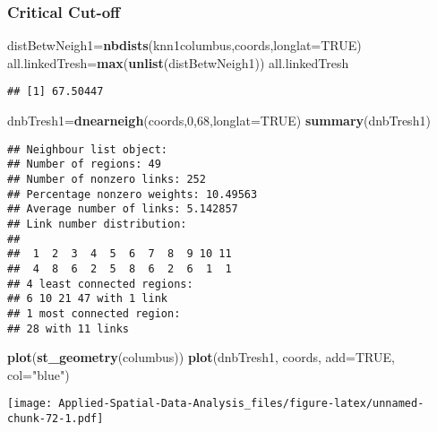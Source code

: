 \documentclass[
]{book}
\newenvironment{Shaded}{\begin{snugshade}}{\end{snugshade}}
\newcommand{\DataTypeTok}[1]{\textcolor[rgb]{0.13,0.29,0.53}{#1}}
\newcommand{\DecValTok}[1]{\textcolor[rgb]{0.00,0.00,0.81}{#1}}
\newcommand{\KeywordTok}[1]{\textcolor[rgb]{0.13,0.29,0.53}{\textbf{#1}}}
\newcommand{\NormalTok}[1]{#1}
\newcommand{\OtherTok}[1]{\textcolor[rgb]{0.56,0.35,0.01}{#1}}
\newcommand{\StringTok}[1]{\textcolor[rgb]{0.31,0.60,0.02}{#1}}
\begin{document}
\hypertarget{critical-cut-off}{%
\subsubsection{Critical Cut-off}\label{critical-cut-off}}

\begin{Shaded}
\begin{Highlighting}[]
\NormalTok{distBetwNeigh1=}\KeywordTok{nbdists}\NormalTok{(knn1columbus,coords,}\DataTypeTok{longlat=}\OtherTok{TRUE}\NormalTok{)}
\NormalTok{all.linkedTresh=}\KeywordTok{max}\NormalTok{(}\KeywordTok{unlist}\NormalTok{(distBetwNeigh1))}
\NormalTok{all.linkedTresh}
\end{Highlighting}
\end{Shaded}

\begin{verbatim}
## [1] 67.50447
\end{verbatim}

\begin{Shaded}
\begin{Highlighting}[]
\NormalTok{dnbTresh1=}\KeywordTok{dnearneigh}\NormalTok{(coords,}\DecValTok{0}\NormalTok{,}\DecValTok{68}\NormalTok{,}\DataTypeTok{longlat=}\OtherTok{TRUE}\NormalTok{)}
\KeywordTok{summary}\NormalTok{(dnbTresh1)}
\end{Highlighting}
\end{Shaded}

\begin{verbatim}
## Neighbour list object:
## Number of regions: 49 
## Number of nonzero links: 252 
## Percentage nonzero weights: 10.49563 
## Average number of links: 5.142857 
## Link number distribution:
## 
##  1  2  3  4  5  6  7  8  9 10 11 
##  4  8  6  2  5  8  6  2  6  1  1 
## 4 least connected regions:
## 6 10 21 47 with 1 link
## 1 most connected region:
## 28 with 11 links
\end{verbatim}

\begin{Shaded}
\begin{Highlighting}[]
\KeywordTok{plot}\NormalTok{(}\KeywordTok{st_geometry}\NormalTok{(columbus))}
\KeywordTok{plot}\NormalTok{(dnbTresh1, coords, }\DataTypeTok{add=}\OtherTok{TRUE}\NormalTok{, }\DataTypeTok{col=}\StringTok{"blue"}\NormalTok{)}
\end{Highlighting}
\end{Shaded}

\texttt{[image: Applied-Spatial-Data-Analysis\_files/figure-latex/unnamed-chunk-72-1.pdf]}
\end{document}
